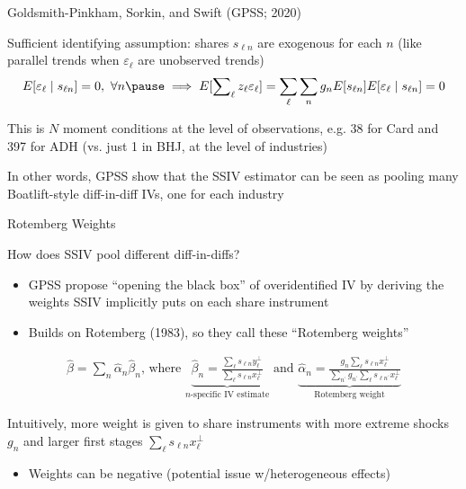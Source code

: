 \documentclass[t]{beamer}
\begin{document}
\begin{frame}{Goldsmith-Pinkham, Sorkin, and Swift (GPSS; 2020)} 

Sufficient identifying assumption: shares $s_{\ell n}$ are exogenous for each $n$ (like parallel trends when $\varepsilon_\ell$ are unobserved trends)
\begin{align*}
E[\varepsilon_\ell\mid s_{\ell n}]=0,\text{ }\forall n \pause\implies E[\sum_\ell\nolimits z_\ell\varepsilon_\ell]=\sum_\ell\sum_n g_nE[s_{\ell n}]E[\varepsilon_\ell\mid s_{\ell n}]=0
\end{align*}

This is $N$ moment conditions at the level of observations, e.g. 38 for Card and 397 for ADH (vs. just 1 in BHJ, at the level of industries)
\bigskip

In other words, GPSS show that the SSIV estimator can be seen as pooling many Boatlift-style diff-in-diff IVs, one for each industry

\end{frame}

\begin{frame}{Rotemberg Weights}

\vspace{-0.3cm}
How does SSIV pool different diff-in-diffs?
\medskip

\begin{itemize}
  \item GPSS propose ``opening the black box'' of overidentified IV by deriving the weights SSIV implicitly puts on each share instrument\smallskip
  \item Builds on Rotemberg (1983), so they call these ``Rotemberg weights''
\end{itemize}
\begin{align*}
\hat{\beta}=\sum_n \hat{\alpha}_n\hat{\beta}_n\text{, where }\underbrace{\hat{\beta}_n=\frac{\sum_\ell s_{\ell n}y_\ell^\perp}{\sum_\ell s_{\ell n}x_\ell^\perp}}_{\text{$n$-specific IV estimate}}\text{ and }\underbrace{\hat{\alpha}_n=\frac{g_n\sum_\ell s_{\ell n}x_\ell^\perp}{\sum_{n^\prime}g_{n^\prime}\sum_\ell s_{\ell n^\prime}x_\ell^\perp}}_{\text{Rotemberg weight}}
\end{align*}
\pause

Intuitively, more weight is given to share instruments with more extreme shocks $g_n$ and larger first stages $\sum_\ell s_{\ell n}x_\ell^\perp$\smallskip
\begin{itemize}
\item Weights can be negative (potential issue w/heterogeneous effects)
\end{itemize}
\end{frame}
\end{document}
